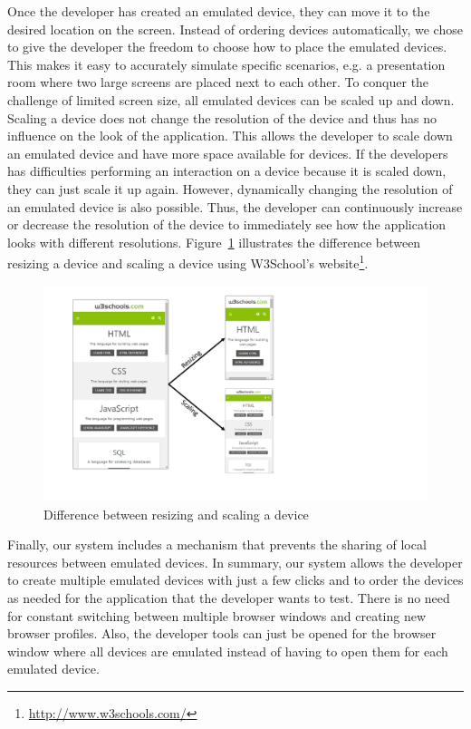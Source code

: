 Once the developer has created an emulated device, they can move it to the desired location on the screen. Instead of ordering devices automatically, we chose to give the developer the freedom to choose how to place the emulated devices. This makes it easy to accurately simulate specific scenarios, e.g. a presentation room where two large screens are placed next to each other. To conquer the challenge of limited screen size, all emulated devices can be scaled up and down. Scaling a device does not change the resolution of the device and thus has no influence on the look of the application. This allows the developer to scale down an emulated device and have more space available for devices. If the developers has difficulties performing an interaction on a device because it is scaled down, they can just scale it up again. However, dynamically changing the resolution of an emulated device is also possible. Thus, the developer can continuously increase or decrease the resolution of the device to immediately see how the application looks with different resolutions. Figure~\ref{fig:difference_resizing_scaling} illustrates the difference between resizing a device and scaling a device using W3School's website\footnote{\url{http://www.w3schools.com/}}.

\begin{figure}[H]
  \centering
    \includegraphics[width=1.0\textwidth]{images/difference_scaling_resizing.pdf}
	\caption[Difference between resizing and scaling a device]{Difference between resizing and scaling a device}
	\label{fig:difference_resizing_scaling}
\end{figure}

Finally, our system includes a mechanism that prevents the sharing of local resources between emulated devices. In summary, our system allows the developer to create multiple emulated devices with just a few clicks and to order the devices as needed for the application that the developer wants to test. There is no need for constant switching between multiple browser windows and creating new browser profiles. Also, the developer tools can just be opened for the browser window where all devices are emulated instead of having to open them for each emulated device.
 
